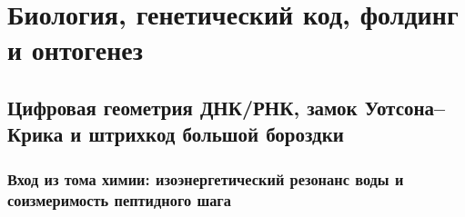 \part{Биология, генетический код, фолдинг и онтогенез}

\chapter{Цифровая геометрия ДНК/РНК, замок Уотсона--Крика и штрихкод большой бороздки}
\label{ch:bio-dna-barcode}

\section{Вход из тома химии: изоэнергетический резонанс воды и соизмеримость пептидного шага}
\label{sec:bio-chem-input}

